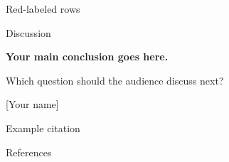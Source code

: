 \documentclass[aspectratio=\BeamerAspectRatio]{beamer}
\begin{document}
\begin{frame}{Red-labeled rows}
\end{frame}

\begin{frame}{Discussion}
  \vfill
  {\Large\bfseries Your main conclusion goes here.\par}
  \vspace{7mm}
  Which question should the audience discuss next?\par
  \vspace{7mm}
  {\small\color{Muted}[Your name]\par}
  \vfill
  Example citation \citep{10.3389/fpsyg.2019.03087}
\end{frame}

\begin{frame}[allowframebreaks]{References}
\renewcommand*{\bibfont}{\scriptsize}
\printbibliography
\end{frame}

\end{document}
